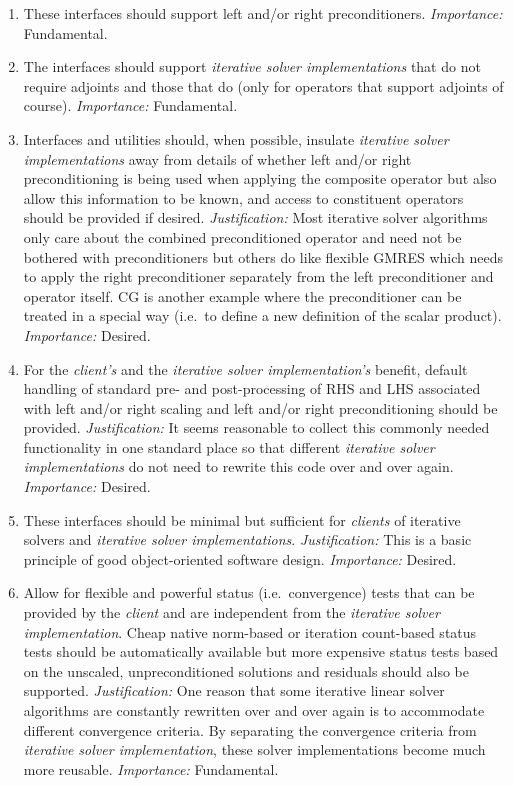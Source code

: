 \documentclass[pdf,ps2pdf,11pt]{SANDreport}
\begin{document}
\begin{enumerate}
\item
These interfaces should support left and/or right preconditioners.
{}\textit{Importance:} Fundamental.

\item
The interfaces should support {}\textit{iterative solver
implementations} that do not require adjoints and those that do (only
for operators that support adjoints of course).
{}\textit{Importance:} Fundamental.

\item
Interfaces and utilities should, when possible, insulate
{}\textit{iterative solver implementations} away from details of
whether left and/or right preconditioning is being used when applying
the composite operator but also allow this information to be known,
and access to constituent operators should be provided if desired.
{}\textit{Justification:} Most iterative solver algorithms only care
about the combined preconditioned operator and need not be bothered
with preconditioners but others do like flexible GMRES which needs to
apply the right preconditioner separately from the left preconditioner
and operator itself.  CG is another example where the preconditioner
can be treated in a special way (i.e.~to define a new definition of
the scalar product). {}\textit{Importance:} Desired.

\item
For the {}\textit{client's} and the {}\textit{iterative solver
implementation's} benefit, default handling of standard pre- and
post-processing of RHS and LHS associated with left and/or right
scaling and left and/or right preconditioning should be provided.
{}\textit{Justification:} It seems reasonable to collect this commonly
needed functionality in one standard place so that different
{}\textit{iterative solver implementations} do not need to rewrite
this code over and over again.  {}\textit{Importance:} Desired.

\item
These interfaces should be minimal but sufficient for
{}\textit{clients} of iterative solvers and {}\textit{iterative solver
implementations}.  {}\textit{Justification:} This is a basic principle
of good object-oriented software design.  {}\textit{Importance:}
Desired.

\item
Allow for flexible and powerful status (i.e.~convergence) tests that
can be provided by the {}\textit{client} and are independent from the
{}\textit{iterative solver implementation}.  Cheap native norm-based
or iteration count-based status tests should be automatically
available but more expensive status tests based on the unscaled,
unpreconditioned solutions and residuals should also be supported.
{}\textit{Justification:} One reason that some iterative linear solver
algorithms are constantly rewritten over and over again is to
accommodate different convergence criteria.  By separating the
convergence criteria from {}\textit{iterative solver implementation},
these solver implementations become much more reusable.
{}\textit{Importance:} Fundamental.


\end{enumerate}
\end{document}
